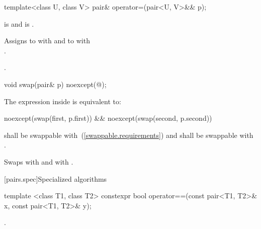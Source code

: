 \begin{itemdecl}
template<class U, class V> pair& operator=(pair<U, V>&& p);
\end{itemdecl}

\begin{itemdescr}
\pnum
\requires {} is 
and  is .

\pnum
\effects
Assigns to  with 
and to  with\\ .

\pnum
\returns {}.
\end{itemdescr}

\begin{itemdecl}
void swap(pair& p) noexcept(@\seebelow@);
\end{itemdecl}

\begin{itemdescr}
\pnum
\remarks The expression inside  is equivalent to:

\begin{codeblock}
noexcept(swap(first, p.first)) &&
noexcept(swap(second, p.second))
\end{codeblock}

\pnum
\requires
{} shall be swappable with~(\ref{swappable.requirements})
 and  shall be swappable with .

\pnum
\effects Swaps
 with  and
 with .
\end{itemdescr}

[pairs.spec]{Specialized algorithms}

%
\begin{itemdecl}
template <class T1, class T2>
  constexpr bool operator==(const pair<T1, T2>& x, const pair<T1, T2>& y);
\end{itemdecl}

\begin{itemdescr}
\pnum
\returns
{}.
\end{itemdescr}

